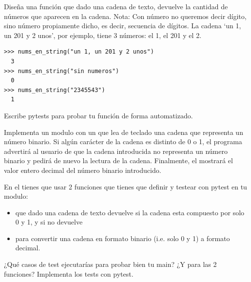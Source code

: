 \begin{ejercicio}
Diseña una función que dado una cadena de texto, devuelve la cantidad de números que aparecen en la cadena. Nota: Con número no queremos decir dígito, sino número propiamente dicho, es decir, secuencia de dígitos. La cadena `un 1, un 201 y 2 unos', por ejemplo, tiene 3 números: el 1, el 201 y el 2.\\

\begin{Verbatim}[frame=single, label={\em ejemplo de ejecuciones}]
>>> nums_en_string("un 1, un 201 y 2 unos")
  3
>>> nums_en_string("sin numeros")
  0
>>> nums_en_string("2345543")
  1
\end{Verbatim}

Escribe pytests para probar tu función de forma automatizado.

\end{ejercicio}

\begin{ejercicio}

Implementa un modulo con un  que lea de teclado una cadena que representa un número binario. Si algún carácter de la cadena es distinto de 0 o 1, el programa advertirá al usuario de que la cadena introducida no representa un número binario y pedirá de nuevo la lectura de la cadena. Finalmente, el  mostrará el valor entero decimal del número binario introducido.

En el  tienes que usar 2 funciones que tienes que definir y testear con pytest en tu modulo:

\begin{itemize}
\item {} que dado una cadena de texto devuelve  si la cadena esta compuesto por solo 0 y 1, y si no devuelve 
\item {} para convertir una cadena en formato binario (i.e. solo 0 y 1) a formato decimal.
\end{itemize}

¿Qué casos de test ejecutarías para probar bien tu main?
¿Y para las 2 funciones? Implementa los tests con pytest.


\end{ejercicio}

